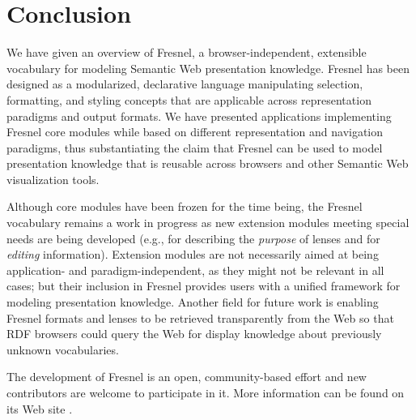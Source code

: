 \section{Conclusion}

We have given an overview of Fresnel, a browser-independent, extensible vocabulary for modeling Semantic Web presentation knowledge. Fresnel has been designed as a modularized, declarative language manipulating selection, formatting, and styling concepts that are applicable across representation paradigms and output formats. We have presented applications implementing Fresnel core modules while based on different representation and navigation paradigms, thus substantiating the claim that Fresnel can be used to model presentation knowledge that is reusable across browsers and other Semantic Web visualization tools.

Although core modules have been frozen for the time being, the Fresnel vocabulary remains a work in progress as new extension modules meeting special needs are being developed  (e.g., for describing the {\em purpose} of lenses and for {\em editing} information). Extension modules are not necessarily aimed at being application- and paradigm-independent, as they might not be relevant in all cases; but their inclusion in Fresnel provides users with a unified framework for modeling presentation knowledge. Another field for future work is enabling Fresnel formats and lenses to be retrieved transparently from the Web so that RDF browsers could query the Web for display knowledge about previously unknown vocabularies.

The development of Fresnel is an open, community-based effort and new contributors are welcome to participate in it. More information can be found on its Web site . 

